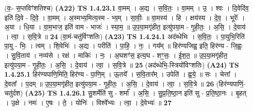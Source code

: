 \documentclass[17pt]{extarticle}
\begin{document}
                  \newline
                      (वः॒- स॒प्तविꣳ॑शतिश्च)  \textbf{(A22)} \newline \newline
                                \textbf{ TS 1.4.23.1} \newline
                  वा॒मम् । अ॒द्य । स॒वि॒तः॒ । वा॒मम् । उ॒ । श्वः । दि॒वेदि॑व॒ इति॑ दि॒वे - दि॒वे॒ । वा॒मम् । अ॒स्मभ्य॒मित्य॒स्म - भ्य॒म् । सा॒वीः॒ ॥ वा॒मस्य॑ । हि । क्षय॑स्य । दे॒व॒ । भूरेः᳚ । अ॒या । धि॒या । वा॒म॒भाज॒ इति॑ वाम - भाजः॑ । स्या॒म॒ ॥ उ॒प॒या॒मगृ॑हीत॒ इत्यु॑पया॒म - गृ॒ही॒तः॒ । अ॒सि॒ । दे॒वाय॑ । त्वा॒ । स॒वि॒त्रे ॥ \textbf{  24} \newline
                  \newline
                      (वा॒मं-चतु॑र्विꣳशतिः)  \textbf{(A23)} \newline \newline
                                \textbf{ TS 1.4.24.1} \newline
                  अद॑ब्धेभिः । स॒वि॒तः॒ । पा॒युभि॒रिति॑ पा॒यु - भिः॒ । त्वम् । शि॒वेभिः॑ । अ॒द्य । परीति॑ । पा॒हि॒ । नः॒ । गय᳚म् ॥ हिर॑ण्यजिह्व॒ इति॒ हिर॑ण्य - जि॒ह्वः॒ । सु॒वि॒ताय॑ । नव्य॑से । रक्ष॑ । माकिः॑ । नः॒ । अ॒घशꣳ॑स॒ इत्य॒घ - शꣳ॒॒सः॒ । ई॒श॒त॒ ॥ उ॒प॒या॒मगृ॑हीत॒ इत्यु॑पया॒म - गृ॒ही॒तः॒ । अ॒सि॒ । दे॒वाय॑ । त्वा॒ । स॒वि॒त्रे ॥ \textbf{  25 } \newline
                  \newline
                      (अद॑ब्धेभि॒-स्त्रियो॑विꣳशतिः)  \textbf{(A24)} \newline \newline
                                \textbf{ TS 1.4.25.1} \newline
                  हिर॑ण्यपाणि॒मिति॒ हिर॑ण्य - पा॒णि॒म् । ऊ॒तये᳚ । स॒वि॒तार᳚म् । उपेति॑ । ह्व॒ये॒ ॥ सः । चेत्ता᳚ । दे॒वता᳚ । प॒दम् ॥ उ॒प॒या॒मगृ॑हीत॒ इत्यु॑पया॒म - गृ॒ही॒तः॒ । अ॒सि॒ । दे॒वाय॑ । त्वा॒ । स॒वि॒त्रे ॥ \textbf{  26} \newline
                  \newline
                      (हिर॑ण्यपाणिं॒-चतु॑र्दश)  \textbf{(A25)} \newline \newline
                                \textbf{ TS 1.4.26.1} \newline
                  सु॒शर्मेति॑ सु - शर्मा᳚ । अ॒सि॒ । सु॒प्र॒ति॒ष्ठा॒न इति॑ सु - प्र॒ति॒ष्ठा॒नः । बृ॒हत् । उ॒क्षे । नमः॑ । ए॒षः । ते॒ । योनिः॑ । विश्वे᳚भ्यः । त्वा॒ । दे॒वेभ्यः॑ ॥ \textbf{  27} \newline
\end{document}
